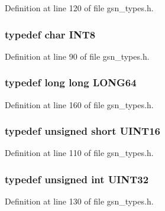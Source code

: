 Definition at line 120 of file gsn\_\-types.h.

\hypertarget{a00660_ga307b8734c020247f6bac4fcde0dcfbb9}{
\subsubsection[{INT8}]{\setlength{\rightskip}{0pt plus 5cm}typedef char {\bf INT8}}}
\label{a00660_ga307b8734c020247f6bac4fcde0dcfbb9}


Definition at line 90 of file gsn\_\-types.h.

\hypertarget{a00660_gae57305825c7d329ad8a3065ae045e875}{
\subsubsection[{LONG64}]{\setlength{\rightskip}{0pt plus 5cm}typedef long long {\bf LONG64}}}
\label{a00660_gae57305825c7d329ad8a3065ae045e875}


Definition at line 160 of file gsn\_\-types.h.

\hypertarget{a00660_ga09f1a1fb2293e33483cc8d44aefb1eb1}{
\subsubsection[{UINT16}]{\setlength{\rightskip}{0pt plus 5cm}typedef unsigned short {\bf UINT16}}}
\label{a00660_ga09f1a1fb2293e33483cc8d44aefb1eb1}


Definition at line 110 of file gsn\_\-types.h.

\hypertarget{a00660_gae1e6edbbc26d6fbc71a90190d0266018}{
\subsubsection[{UINT32}]{\setlength{\rightskip}{0pt plus 5cm}typedef unsigned int {\bf UINT32}}}
\label{a00660_gae1e6edbbc26d6fbc71a90190d0266018}


Definition at line 130 of file gsn\_\-types.h.

